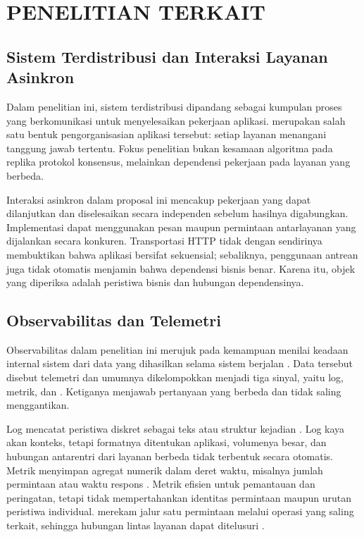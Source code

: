 \chapter{PENELITIAN TERKAIT}

\section{Sistem Terdistribusi dan Interaksi Layanan Asinkron}
Dalam penelitian ini, sistem terdistribusi dipandang sebagai kumpulan proses yang berkomunikasi untuk menyelesaikan pekerjaan aplikasi.  merupakan salah satu bentuk pengorganisasian aplikasi tersebut: setiap layanan menangani tanggung jawab tertentu. Fokus penelitian bukan kesamaan algoritma pada replika protokol konsensus, melainkan dependensi pekerjaan pada layanan yang berbeda.

Interaksi asinkron dalam proposal ini mencakup pekerjaan yang dapat dilanjutkan dan diselesaikan secara independen sebelum hasilnya digabungkan. Implementasi dapat menggunakan pesan maupun permintaan antarlayanan yang dijalankan secara konkuren. Transportasi HTTP tidak dengan sendirinya membuktikan bahwa aplikasi bersifat sekuensial; sebaliknya, penggunaan antrean juga tidak otomatis menjamin bahwa dependensi bisnis benar. Karena itu, objek yang diperiksa adalah peristiwa bisnis dan hubungan dependensinya.

\section{Observabilitas dan Telemetri}
\label{sec:observability}
Observabilitas dalam penelitian ini merujuk pada kemampuan menilai keadaan internal sistem dari data yang dihasilkan selama sistem berjalan \citep{otelprimer}. Data tersebut disebut telemetri dan umumnya dikelompokkan menjadi tiga sinyal, yaitu log, metrik, dan . Ketiganya menjawab pertanyaan yang berbeda dan tidak saling menggantikan.

Log mencatat peristiwa diskret sebagai teks atau struktur kejadian \citep{otellogs}. Log kaya akan konteks, tetapi formatnya ditentukan aplikasi, volumenya besar, dan hubungan antarentri dari layanan berbeda tidak terbentuk secara otomatis. Metrik menyimpan agregat numerik dalam deret waktu, misalnya jumlah permintaan atau waktu respons \citep{otelmetrics}. Metrik efisien untuk pemantauan dan peringatan, tetapi tidak mempertahankan identitas permintaan maupun urutan peristiwa individual.  merekam jalur satu permintaan melalui operasi yang saling terkait, sehingga hubungan lintas layanan dapat ditelusuri \citep{oteltraces,dapper2010}.

